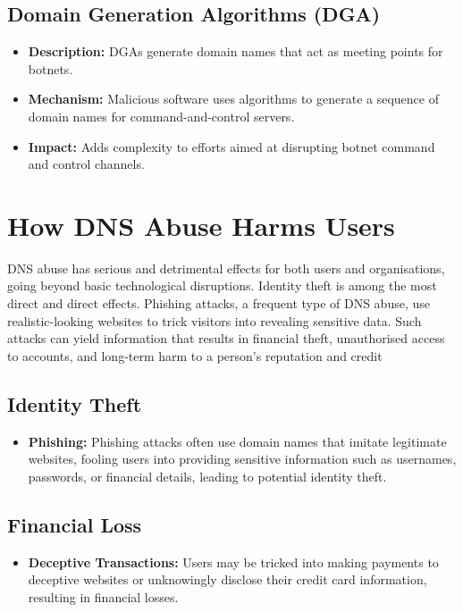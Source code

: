 \subsection{Domain Generation Algorithms (DGA)}
\begin{itemize}
    \item \textbf{Description:} DGAs generate domain names that act as meeting points for botnets.\cite{antonakakis2012throw}
    \item \textbf{Mechanism:} Malicious software uses algorithms to generate a sequence of domain names for command-and-control servers.
    \item \textbf{Impact:} Adds complexity to efforts aimed at disrupting botnet command and control channels.
\end{itemize}

\section{How DNS Abuse Harms Users}

DNS abuse has serious and detrimental effects for both users and organisations, going beyond basic technological disruptions. Identity theft is among the most direct and direct effects. Phishing attacks, a frequent type of DNS abuse, use realistic-looking websites to trick visitors into revealing sensitive data. Such attacks can yield information that results in financial theft, unauthorised access to accounts, and long-term harm to a person's reputation and credit

\subsection{Identity Theft}
\begin{itemize}
    \item \textbf{Phishing:} Phishing attacks often use domain names that imitate legitimate websites, fooling users into providing sensitive information such as usernames, passwords, or financial details, leading to potential identity theft.\cite{godaddy2023dnsabuse, jakobsson2006phishing}
\end{itemize}

\subsection{Financial Loss}
\begin{itemize}
    \item \textbf{Deceptive Transactions:} Users may be tricked into making payments to deceptive websites or unknowingly disclose their credit card information, resulting in financial losses.\cite{godaddy2023dnsabuse, bohme2013economics}
\end{itemize}

